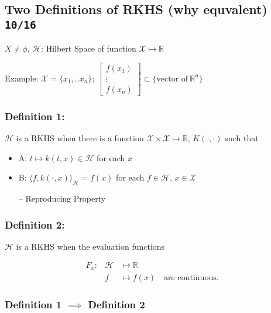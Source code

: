 \documentclass[10pt,portrait]{article}
\begin{document}
\hypertarget{two-definitions-of-rkhs-why-equvalent-1016}{%
\subsection{\texorpdfstring{Two Definitions of RKHS (why equvalent)
\texttt{10/16}}{Two Definitions of RKHS (why equvalent) 10/16}}\label{two-definitions-of-rkhs-why-equvalent-1016}}

\(X\neq\phi\), \(\mathcal{H}\): Hilbert Space of function
\(\mathcal{X}\mapsto\mathbb{R}\)

Example: \(\mathcal{X}=\{x_1,..x_n\}\);
\(\begin{bmatrix} f(x_1)\\\vdots\\f(x_n) \end{bmatrix}\subset\{\text{vector of}\ \mathbb{R}^n\}\)

\hypertarget{definition-1}{%
\subsubsection{Definition 1:}\label{definition-1}}

\(\mathcal{H}\) is a RKHS when there is a function
\(\mathcal{X}\times\mathcal{X}\mapsto\mathbb{R}\), \(K(\cdot,\cdot)\)
such that

\begin{itemize}
\item
  A: \(t\mapsto k(t,x)\in\mathcal{H}\) for each \(x\)
\item
  B: \(\langle f,k(\cdot,x)\rangle_{\mathcal{H}}=f(x)\) for each
  \(f\in\mathcal{H}\), \(x\in\mathcal{X}\)

  -- Reproducing Property
\end{itemize}

\hypertarget{definition-2}{%
\subsubsection{Definition 2:}\label{definition-2}}

\(\mathcal{H}\) is a RKHS when the evaluation functions

\begin{eqnarray*}
F_x: & \mathcal{H}&\mapsto\mathbb{R} \\& f&\mapsto f(x) \quad \text{are continuous.}
\end{eqnarray*}

\hypertarget{definition-1-implies-definition-2}{%
\subsubsection{\texorpdfstring{Definition 1 \(\implies\) Definition
2}{Definition 1 \textbackslash{}implies Definition 2}}\label{definition-1-implies-definition-2}}
\end{document}
